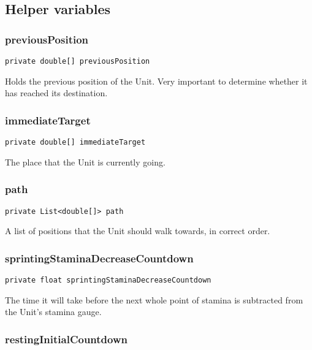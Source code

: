 \documentclass[11pt]{article}
\begin{document}
\subsection{Helper variables}
\label{sec-7-2}

\subsubsection{previousPosition}
\label{sec-7-2-1}

\begin{verbatim}
private double[] previousPosition
\end{verbatim}

Holds the previous position of the Unit. Very important to determine whether it
has reached its destination.


\subsubsection{immediateTarget}
\label{sec-7-2-2}

\begin{verbatim}
private double[] immediateTarget
\end{verbatim}

The place that the Unit is currently going. 


\subsubsection{path}
\label{sec-7-2-3}

\begin{verbatim}
private List<double[]> path
\end{verbatim}

A list of positions that the Unit should walk towards, in correct order.


\subsubsection{sprintingStaminaDecreaseCountdown}
\label{sec-7-2-4}

\begin{verbatim}
private float sprintingStaminaDecreaseCountdown
\end{verbatim}

The time it will take before the next whole point of stamina is subtracted from
the Unit's stamina gauge.


\subsubsection{restingInitialCountdown}
\label{sec-7-2-5}
\end{document}
